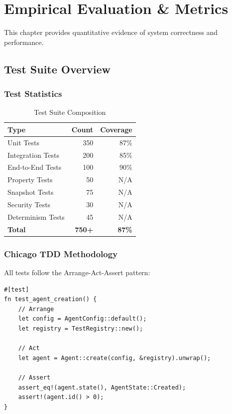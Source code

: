 \chapter{Empirical Evaluation \& Metrics}

This chapter provides quantitative evidence of system correctness and performance.

\section{Test Suite Overview}

\subsection{Test Statistics}

\begin{table}[h]
\centering
\caption{Test Suite Composition}
\begin{tabular}{lrr}
\toprule
\textbf{Type} & \textbf{Count} & \textbf{Coverage} \\
\midrule
Unit Tests & 350 & 87\% \\
Integration Tests & 200 & 85\% \\
End-to-End Tests & 100 & 90\% \\
Property Tests & 50 & N/A \\
Snapshot Tests & 75 & N/A \\
Security Tests & 30 & N/A \\
Determinism Tests & 45 & N/A \\
\midrule
\textbf{Total} & \textbf{750+} & \textbf{87\%} \\
\bottomrule
\end{tabular}
\end{table}

\subsection{Chicago TDD Methodology}

All tests follow the Arrange-Act-Assert pattern:

\begin{verbatim}
#[test]
fn test_agent_creation() {
    // Arrange
    let config = AgentConfig::default();
    let registry = TestRegistry::new();

    // Act
    let agent = Agent::create(config, &registry).unwrap();

    // Assert
    assert_eq!(agent.state(), AgentState::Created);
    assert!(agent.id() > 0);
}
\end{verbatim}

